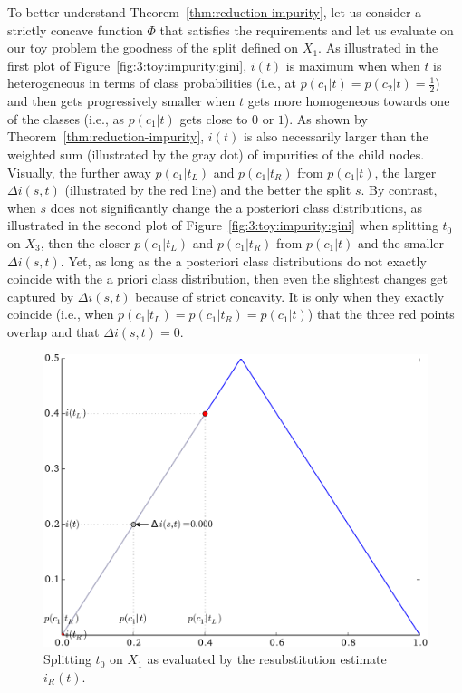To better understand Theorem~\ref{thm:reduction-impurity}, let us consider a
strictly concave function $\Phi$ that satisfies the requirements and let us
evaluate on our toy problem the goodness of the split defined on $X_1$.  As
illustrated in the first plot of Figure~\ref{fig:3:toy:impurity:gini},  $i(t)$
is maximum when when $t$ is heterogeneous in terms of class probabilities
(i.e., at $p(c_1|t)=p(c_2|t)=\tfrac{1}{2}$) and then gets progressively smaller
when $t$ gets more homogeneous towards one of the classes (i.e., as $p(c_1|t)$
gets close to $0$ or $1$). As shown by Theorem~\ref{thm:reduction-impurity},
$i(t)$ is also necessarily larger than the weighted sum (illustrated by the gray
dot) of impurities of the child nodes. Visually, the further away $p(c_1|t_L)$
and $p(c_1|t_R)$ from $p(c_1|t)$, the larger $\Delta i(s,t)$ (illustrated by
the red line) and the better the split $s$. By contrast, when $s$ does not
significantly change the a posteriori class distributions, as illustrated in
the second plot of Figure~\ref{fig:3:toy:impurity:gini} when splitting $t_0$ on
$X_3$, then the closer $p(c_1|t_L)$ and $p(c_1|t_R)$ from $p(c_1|t)$ and the
smaller $\Delta i(s,t)$. Yet, as long as the a posteriori class distributions
do not exactly coincide with the a priori class distribution, then even the
slightest changes get captured by $\Delta i(s, t)$ because of strict concavity.
It is only when they exactly coincide (i.e., when
$p(c_1|t_L)=p(c_1|t_R)=p(c_1|t)$) that the three red points overlap and that
$\Delta i(s,t)=0$.

\begin{figure}
\centering
\includegraphics[scale=0.7]{figures/ch3_toy_x1_error.pdf}
\caption{Splitting $t_0$ on $X_1$ as evaluated by the resubstitution estimate $i_R(t)$.}
\label{fig:3:toy:impurity:error}
\end{figure}

